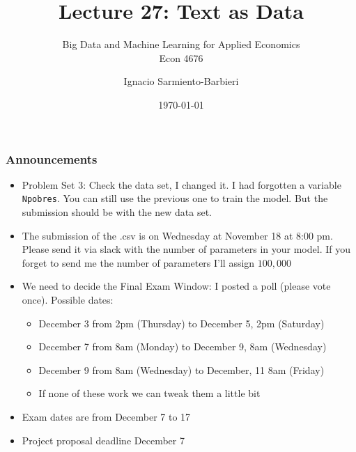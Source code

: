 \documentclass[
  shownotes,
  xcolor={svgnames},
  hyperref={colorlinks,citecolor=DarkBlue,linkcolor=DarkRed,urlcolor=DarkBlue}
  , aspectratio=169]{beamer}
\begin{document}
 
\title[Lecture 27]{Lecture 27:  Text as Data}
\subtitle{Big Data and Machine Learning for Applied Economics \\ Econ 4676}
\date{\today}

\author[Sarmiento-Barbieri]{Ignacio Sarmiento-Barbieri}


\begin{frame}[noframenumbering]
\maketitle
\end{frame}




\begin{frame}
\frametitle{Announcements}

\begin{itemize}
\item Problem Set 3: Check the data set, I changed it. I had forgotten a variable {\tt Npobres}. You can still use the previous one to train the model. But the submission should be with the new data set.
\medskip
\item The submission of the .csv is on Wednesday at November 18 at 8:00 pm. Please send it via slack with the number of parameters in your model. If you forget to send me the number of parameters I'll assign $100,000$
\medskip
\item We need to decide the Final Exam Window: I posted a poll (please vote once). Possible dates:
\begin{itemize}
  \item December 3 from 2pm (Thursday) to December 5, 2pm (Saturday) 
  \item December 7 from 8am (Monday) to December 9, 8am (Wednesday)
  \item December 9 from 8am (Wednesday) to December, 11 8am (Friday)
  \item If none of these work we can tweak them a little bit

\end{itemize}
\item Exam dates are from December 7 to 17 
\item Project proposal deadline December 7
\end{itemize}

\end{frame}
\end{document}
